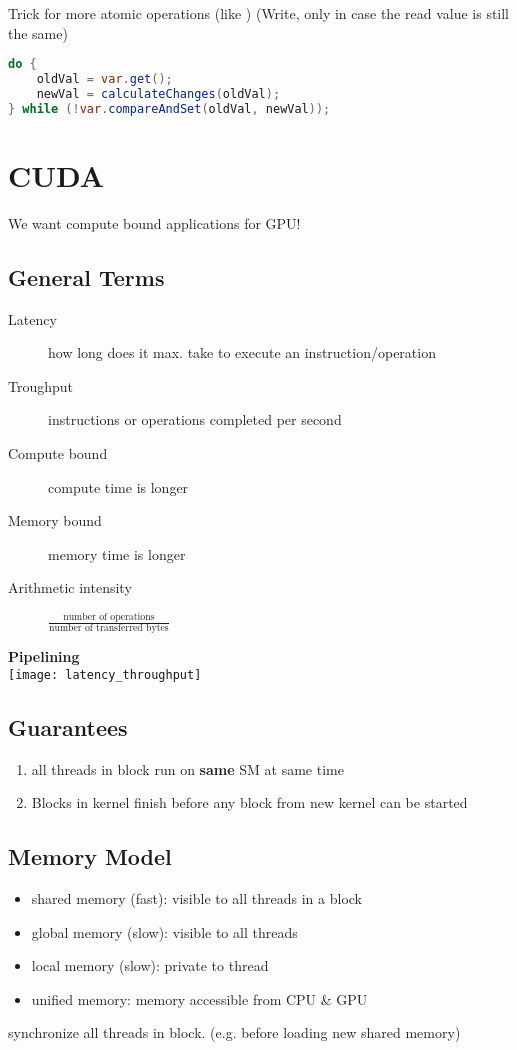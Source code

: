 \begin{multicols*}{4}
    Trick for more atomic operations (like )
    (Write, only in case the read value is still the same)
    \begin{lstlisting}[language=java]
do {
    oldVal = var.get();
    newVal = calculateChanges(oldVal);
} while (!var.compareAndSet(oldVal, newVal));
\end{lstlisting}

\section{CUDA}
We want compute bound applications for GPU!

	\subsection{General Terms}
	\begin{description}
		\item[Latency] 	how long does it max. take to execute an instruction/operation
		\item[Troughput] 	instructions or operations completed per second
		\item[Compute bound] compute time is longer
		\item[Memory bound] memory time is longer
		\item[Arithmetic intensity] \(\frac{\text{number of operations}}{\text{number of transferred bytes}}\)
	\end{description}
	\textbf{Pipelining} \\ \texttt{[image: latency\_throughput]}

	\subsection{Guarantees}
	\begin{enumerate}
		\item all threads in block run on \textbf{same} SM at same time
		\item Blocks in kernel finish before any block from new kernel can be started
	\end{enumerate}

	\subsection{Memory Model}
	\begin{itemize}
		\item shared memory (fast): visible to all threads in a block
		\item global memory (slow): visible to all threads
		\item local memory (slow): private to thread
		\item unified memory: memory accessible from CPU \& GPU
	\end{itemize}
	 synchronize all threads in block. (e.g. before loading new shared memory)


\end{multicols*}
